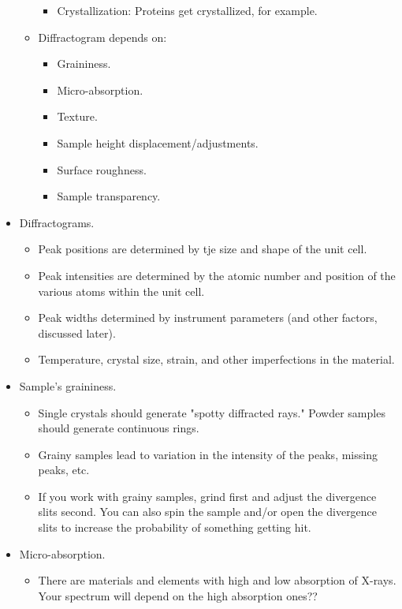 \documentclass[../notes.tex]{subfiles}
\begin{document}
\begin{itemize}
\begin{itemize}
\begin{itemize}
            \item Crystallization: Proteins get crystallized, for example.
        \end{itemize}
        \item Diffractogram depends on:
        \begin{itemize}
            \item Graininess.
            \item Micro-absorption.
            \item Texture.
            \item Sample height displacement/adjustments.
            \item Surface roughness.
            \item Sample transparency.
        \end{itemize}
    \end{itemize}
    \item Diffractograms.
    \begin{itemize}
        \item Peak positions are determined by tje size and shape of the unit cell.
        \item Peak intensities are determined by the atomic number and position of the various atoms within the unit cell.
        \item Peak widths determined by instrument parameters (and other factors, discussed later).
        \item Temperature, crystal size, strain, and other imperfections in the material.
    \end{itemize}
    \item Sample's graininess.
    \begin{itemize}
        \item Single crystals should generate "spotty diffracted rays." Powder samples should generate continuous rings.
        \item Grainy samples lead to variation in the intensity of the peaks, missing peaks, etc.
        \item If you work with grainy samples, grind first and adjust the divergence slits second. You can also spin the sample and/or open the divergence slits to increase the probability of something getting hit.
    \end{itemize}
    \item Micro-absorption.
    \begin{itemize}
        \item There are materials and elements with high and low absorption of X-rays. Your spectrum will depend on the high absorption ones??

\end{itemize}
\end{itemize}
\end{document}
